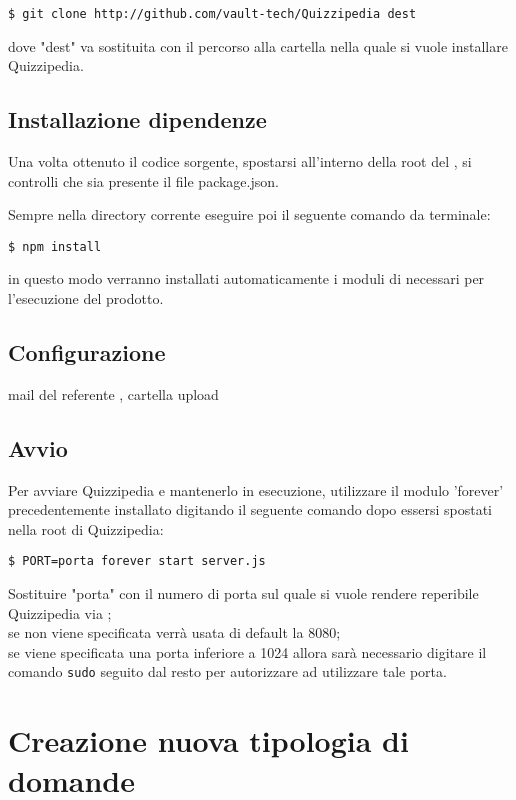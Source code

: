 \documentclass[a4paper, titlepage]{article}
\begin{document}
	\texttt{\$ git clone http://github.com/vault-tech/Quizzipedia dest}

	dove "dest" va sostituita con il percorso alla cartella nella quale si vuole installare Quizzipedia.

	\subsection{Installazione dipendenze}
	
	Una volta ottenuto il codice sorgente, spostarsi all'interno della root del , si controlli che sia presente il file package.json.
	
	Sempre nella directory corrente eseguire poi il seguente comando da terminale:
	
	\texttt{\$ npm install}
	
	in questo modo verranno installati automaticamente i moduli di  necessari per l'esecuzione del prodotto.
	
	\subsection{Configurazione}
	mail del referente , cartella upload 
	
	\subsection{Avvio}
	
	Per avviare Quizzipedia e mantenerlo in esecuzione, utilizzare il modulo  'forever' precedentemente installato digitando il seguente comando dopo essersi spostati nella root di Quizzipedia:

	\texttt{\$ PORT=porta forever start server.js}

	Sostituire "porta" con il numero di porta sul quale si vuole rendere reperibile Quizzipedia via ;\\
	se non viene specificata verrà usata di default la 8080;\\
	se viene specificata una porta inferiore a 1024 allora sarà necessario digitare il comando \texttt{sudo} seguito dal resto per autorizzare  ad utilizzare tale porta.
	
	\newpage
	
	\section{Creazione nuova tipologia di domande}
	
\end{document}

